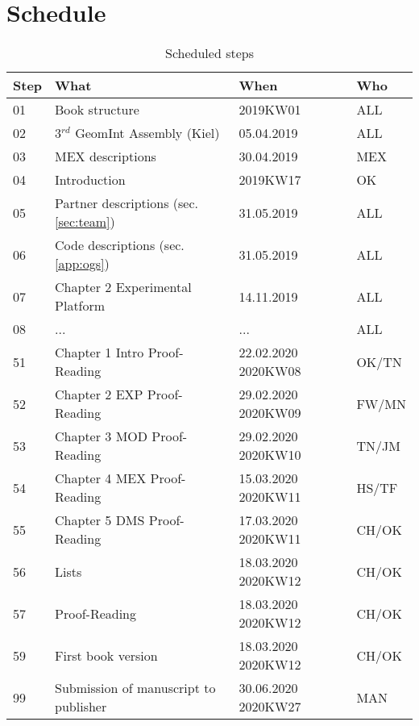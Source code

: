 \section*{Schedule}

\begin{table}[h!]
\centering
\caption{Scheduled steps}
\label{tab:schedule}
\begin{tabular}{|p{0.3in}|p{2.7in}|p{0.7in}|p{0.5in}|} \hline 
\rowcolor{gray!50}
Step & What & When & Who \\ \hline \hline
01 & Book structure & 2019KW01 & ALL \\ \hline 
\hline
02 & 3$^{rd}$ GeomInt Assembly (Kiel) & 05.04.2019 & ALL \\ \hline 
03 & MEX descriptions & 30.04.2019 & MEX \\ \hline 
04 & Introduction & 2019KW17 & OK \\ \hline 
05 & Partner descriptions (sec. \ref{sec:team}) & 31.05.2019 & ALL \\ \hline 
06 & Code descriptions (sec. \ref{app:ogs}) & 31.05.2019 & ALL \\ \hline 
07 & Chapter 2 Experimental Platform & 14.11.2019 & ALL \\ \hline 
\hline
08 & ... & ... & ALL \\ \hline 
\hline
51 & Chapter 1 Intro Proof-Reading & 22.02.2020 2020KW08 & OK/TN \\ \hline 
52 & Chapter 2 EXP Proof-Reading & 29.02.2020 2020KW09 & FW/MN \\ \hline 
53 & Chapter 3 MOD Proof-Reading & 29.02.2020 2020KW10 & TN/JM \\ \hline 
54 & Chapter 4 MEX Proof-Reading & 15.03.2020 2020KW11 & HS/TF \\ \hline 
55 & Chapter 5 DMS Proof-Reading & 17.03.2020 2020KW11 & CH/OK \\ \hline 
56 & Lists & 18.03.2020 2020KW12 & CH/OK \\ \hline 
57 & Proof-Reading & 18.03.2020 2020KW12 & CH/OK \\ \hline 
\rowcolor{green!50}
59 & First book version & 18.03.2020 2020KW12 & CH/OK \\ \hline
\hline
\rowcolor{red!50}
99 & Submission of manuscript to publisher & 30.06.2020 2020KW27 & MAN \\ \hline
\end{tabular}
\end{table}


